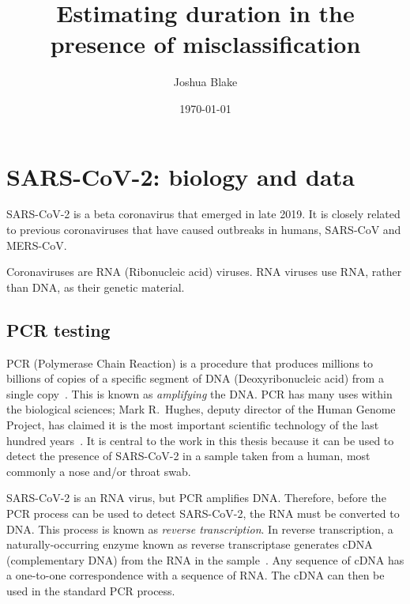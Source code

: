 \documentclass[thesis.tex]{subfiles}
\title{Estimating duration in the presence of misclassification}
\author{Joshua Blake}
\date{\today}
\begin{document}
\ifSubfilesClassLoaded{
  \setcounter{chapter}{1}
}

\chapter{SARS-CoV-2: biology and data} \label{biology-data}


SARS-CoV-2 is a beta coronavirus that emerged in late 2019.
It is closely related to previous coronaviruses that have caused outbreaks in humans, SARS-CoV and MERS-CoV.

Coronaviruses are RNA (Ribonucleic acid) viruses.
RNA viruses use RNA, rather than DNA, as their genetic material.


\section{PCR testing} \label{biology-data:sec:PCR}


PCR (Polymerase Chain Reaction) is a procedure that produces millions to billions of copies of a specific segment of DNA (Deoxyribonucleic acid) from a single copy~\autocite{smithPCR,garibyanPCR}.
This is known as \emph{amplifying} the DNA.
PCR has many uses within the biological sciences; Mark R.\ Hughes, deputy director of the Human Genome Project, has claimed it is the most important scientific technology of the last hundred years~\autocite{powledgePCR}.
It is central to the work in this thesis because it can be used to detect the presence of SARS-CoV-2 in a sample taken from a human, most commonly a nose and/or throat swab.

SARS-CoV-2 is an RNA virus, but PCR amplifies DNA.
Therefore, before the PCR process can be used to detect SARS-CoV-2, the RNA must be converted to DNA.
This process is known as \emph{reverse transcription}.
In reverse transcription, a naturally-occurring enzyme known as reverse transcriptase generates cDNA (complementary DNA) from the RNA in the sample~\autocite{valasekPower}.
Any sequence of cDNA has a one-to-one correspondence with a sequence of RNA.
The cDNA can then be used in the standard PCR process.
\end{document}

